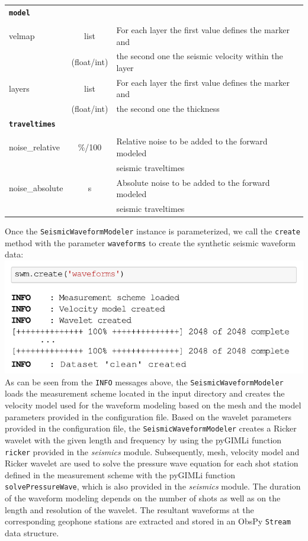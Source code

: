 \documentclass[a4paper,fleqn]{cas-sc}
\begin{document}
\begin{table}[]
\begin{tabular*}{\tblwidth}{@{} LCL@{}}
        \midrule
        \textbf{\texttt{model}} & & \\
         & & \\
        velmap & list & For each layer the first value defines the marker and \\
         & (float/int) & the second one the seismic velocity within the layer \\
        layers & list & For each layer the first value defines the marker and \\
         & (float/int) & the second one the thickness \\
        \midrule
        \textbf{\texttt{traveltimes}} & & \\
         & & \\
        noise\_relative & \%/100 & Relative noise to be added to the forward modeled \\
      	 & & seismic traveltimes \\
        noise\_absolute & s & Absolute noise to be added to the forward modeled \\
         & & seismic traveltimes\\
        \bottomrule
    \end{tabular*}
    \label{tab:config}
\end{table}

Once the \texttt{SeismicWaveformModeler} instance is parameterized, we call the \texttt{create} method with the parameter \texttt{waveforms} to create the synthetic seismic waveform data:
\newline
\includegraphics[width=.5\textwidth]{./figures/create_syn_data.pdf}
\newline
As can be seen from the \texttt{INFO} messages above, the \texttt{SeismicWaveformModeler} loads the measurement scheme located in the input directory and creates the velocity model used for the waveform modeling based on the mesh and the model parameters provided in the configuration file.
Based on the wavelet parameters provided in the configuration file, the \texttt{SeismicWaveformModeler} creates a Ricker wavelet with the given length and frequency by using the pyGIMLi function \texttt{ricker} provided in the \textit{seismics} module. Subsequently, mesh, velocity model and Ricker wavelet are used to solve the pressure wave equation for each shot station defined in the measurement scheme with the pyGIMLi function \texttt{solvePressureWave}, which is also provided in the \textit{seismics} module. The duration of the waveform modeling depends on the number of shots as well as on the length and resolution of the wavelet.
The resultant waveforms at the corresponding geophone stations are extracted and stored in an ObsPy \texttt{Stream} data structure.
\end{document}
